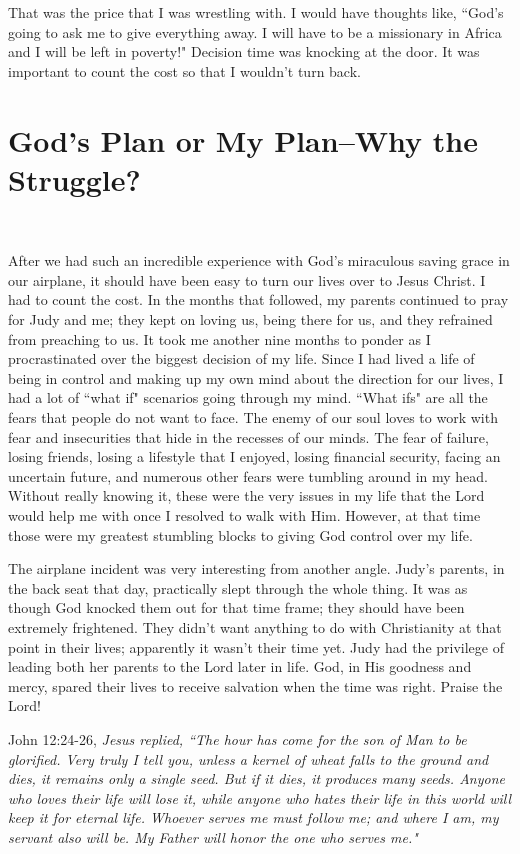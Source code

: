 \documentclass[oneside]{book}
\begin{document}
That was the price that I was wrestling with. I would have thoughts like, ``God's going to ask me to give everything away. I will have to be a missionary in Africa and I will be left in poverty!" Decision time was knocking at the door. It was important to count the cost so that I wouldn't turn back.


\chapter{God's Plan or My Plan--Why the Struggle?}
\

After we had such an incredible experience with God's miraculous saving grace in our airplane, it should have been easy to turn our lives over to Jesus Christ. I had to count the cost. In the months that followed, my parents continued to pray for Judy and me; they kept on loving us, being there for us, and they refrained from preaching to us. It took me another nine months to ponder as I procrastinated over the biggest decision of my life. Since I had lived a life of being in control and making up my own mind about the direction for our lives, I had a lot of ``what if" scenarios going through my mind. ``What ifs" are all the fears that people do not want to face. The enemy of our soul loves to work with fear and insecurities that hide in the recesses of our minds. The fear of failure, losing friends, losing a lifestyle that I enjoyed, losing financial security, facing an uncertain future, and numerous other fears were tumbling around in my head. Without really knowing it, these were the very issues in my life that the Lord would help me with once I resolved to walk with Him. However, at that time those were my greatest stumbling blocks to giving God control over my life. 

The airplane incident was very interesting from another angle. Judy's parents, in the back seat that day, practically slept through the whole thing. It was as though God knocked them out for that time frame; they should have been extremely frightened. They didn't want anything to do with Christianity at that point in their lives; apparently it wasn't their time yet. Judy had the privilege of leading both her parents to the Lord later in life. God, in His goodness and mercy, spared their lives to receive salvation when the time was right. Praise the Lord!

John 12:24-26, \textit{Jesus replied, ``The hour has come for the son of Man to be glorified. Very truly I tell you, unless a kernel of wheat falls to the ground and dies, it remains only a single seed. But if it dies, it produces many seeds. Anyone who loves their life will lose it, while anyone who hates their life in this world will keep it for eternal life. Whoever serves me must follow me; and  where I am, my servant also will be. My Father will honor the one who serves me."}
\end{document}
